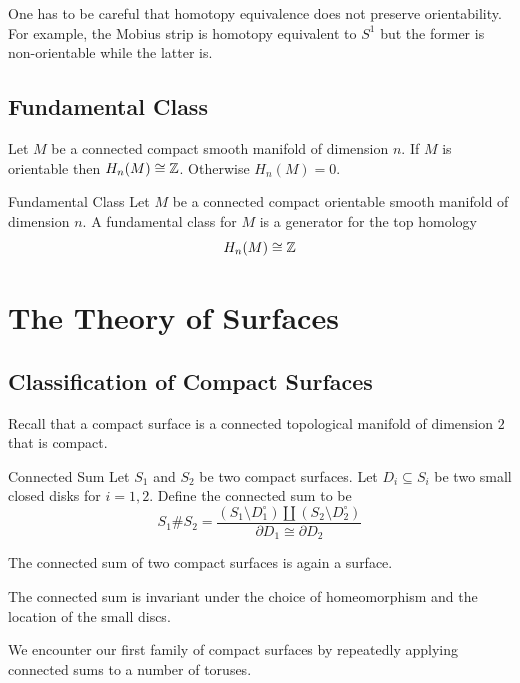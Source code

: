 \documentclass[a4paper]{article}
\begin{document}
One has to be careful that homotopy equivalence does not preserve orientability. For example, the Mobius strip is homotopy equivalent to $S^1$ but the former is non-orientable while the latter is. 

\subsection{Fundamental Class}
\begin{prp}{}{} Let $M$ be a connected compact smooth manifold of dimension $n$. If $M$ is orientable then $H_n(M)\cong\mathbb{Z}$. Otherwise $H_n(M)=0$. 
\end{prp}

\begin{defn}{Fundamental Class}{} Let $M$ be a connected compact orientable smooth manifold of dimension $n$. A fundamental class for $M$ is a generator for the top homology $$H_n(M)\cong\mathbb{Z}$$
\end{defn}

\pagebreak
\section{The Theory of Surfaces}
\subsection{Classification of Compact Surfaces}
Recall that a compact surface is a connected topological manifold of dimension $2$ that is compact. 

\begin{defn}{Connected Sum}{} Let $S_1$ and $S_2$ be two compact surfaces. Let $D_i\subseteq S_i$ be two small closed disks for $i=1,2$. Define the connected sum to be $$S_1\# S_2=\frac{(S_1\setminus D_1^\circ)\amalg(S_2\setminus D_2^\circ)}{\partial D_1\cong\partial D_2}$$
\end{defn}

\begin{lmm}{}{} The connected sum of two compact surfaces is again a surface. 
\end{lmm}

\begin{prp}{}{} The connected sum is invariant under the choice of homeomorphism and the location of the small discs. 
\end{prp}

We encounter our first family of compact surfaces by repeatedly applying connected sums to a number of toruses. 
\end{document}
